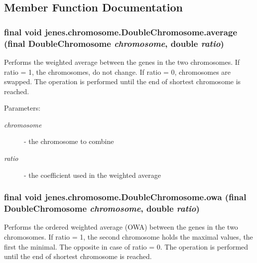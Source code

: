 \subsection{Member Function Documentation}
\hypertarget{classjenes_1_1chromosome_1_1_double_chromosome_83b26a42b307ce1316523e262f044fdd}{
\subsubsection[average]{\setlength{\rightskip}{0pt plus 5cm}final void jenes.chromosome.DoubleChromosome.average (final {\bf DoubleChromosome} {\em chromosome}, \/  double {\em ratio})}}
\label{classjenes_1_1chromosome_1_1_double_chromosome_83b26a42b307ce1316523e262f044fdd}


Performs the weighted average between the genes in the two chromosomes. If ratio = 1, the chromosomes, do not change. If ratio = 0, chromosomes are swapped. The operation is performed until the end of shortest chromosome is reached.

\begin{Desc}
\item[Parameters:]
\begin{description}
\item[{\em chromosome}]- the chromosome to combine \item[{\em ratio}]- the coefficient used in the weighted average \end{description}
\end{Desc}
\hypertarget{classjenes_1_1chromosome_1_1_double_chromosome_eebe5bd21dbc2e8dbbdc135d4d10a4cc}{
\subsubsection[owa]{\setlength{\rightskip}{0pt plus 5cm}final void jenes.chromosome.DoubleChromosome.owa (final {\bf DoubleChromosome} {\em chromosome}, \/  double {\em ratio})}}
\label{classjenes_1_1chromosome_1_1_double_chromosome_eebe5bd21dbc2e8dbbdc135d4d10a4cc}


Performs the ordered weighted average (OWA) between the genes in the two chromosomes. If ratio = 1, the second chromosome holds the maximal values, the first the minimal. The opposite in case of ratio = 0. The operation is performed until the end of shortest chromosome is reached.

